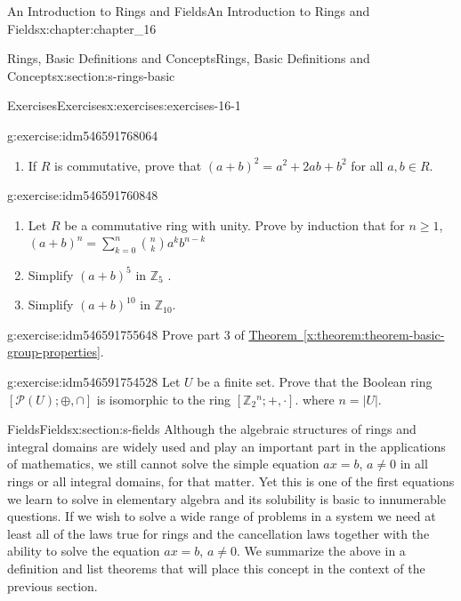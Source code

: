 \documentclass[oneside,10pt,]{book}
\newcommand{\xreffont}{\relax}
\numberwithin{equation}{section}
\begin{document}
\begin{chapterptx}{An Introduction to Rings and Fields}{}{An Introduction to Rings and Fields}{}{}{x:chapter:chapter_16}
\begin{sectionptx}{Rings, Basic Definitions and Concepts}{}{Rings, Basic Definitions and Concepts}{}{}{x:section:s-rings-basic}
\begin{exercises-subsection}{Exercises}{}{Exercises}{}{}{x:exercises:exercises-16-1}
\begin{divisionexercise}{13}{}{}{g:exercise:idm546591768064}
\begin{enumerate}[label=(\alph*)]
\item{}If \(R\) is commutative, prove that \((a + b)^2 = a^2 + 2a b + b^2\)  for all \(a, b \in  R\).%
\end{enumerate}
%
\end{divisionexercise}%
\begin{divisionexercise}{14}{}{}{g:exercise:idm546591760848}%
%
\begin{enumerate}[label=(\alph*)]
\item{}Let \(R\) be a commutative ring with unity. Prove by induction that for \(n \geq  1\), \((a+b)^n= \sum _{k=0}^n  \binom{n}{k}a^k b^{n-k}\)%
\item{}Simplify \((a + b)^5\) in \(\mathbb{Z}_5\) .%
\item{}Simplify \((a + b)^{10}\) in \(\mathbb{Z}_{10}\).%
\end{enumerate}
%
\end{divisionexercise}%
\begin{divisionexercise}{15}{}{}{g:exercise:idm546591755648}%
Prove part 3 of \hyperref[x:theorem:theorem-basic-group-properties]{Theorem~{\xreffont\ref{x:theorem:theorem-basic-group-properties}}}.%
\end{divisionexercise}%
\begin{divisionexercise}{16}{}{}{g:exercise:idm546591754528}%
Let \(U\) be a finite set. Prove that the Boolean ring \([\mathcal{P}(U);\oplus ,\cap ]\) is isomorphic to the ring \(\left[\mathbb{Z}_2{}^n; +, \cdot \right]\). where \(n =\left| U\right|\).%
\end{divisionexercise}%
\end{exercises-subsection}
\end{sectionptx}
%
%
\typeout{************************************************}
\typeout{************************************************}
%
\begin{sectionptx}{Fields}{}{Fields}{}{}{x:section:s-fields}
Although the algebraic structures of rings and integral domains are widely used and play an important part in the applications of mathematics, we still cannot solve the simple equation \(a x = b\), \(a \neq  0\) in all rings or  all integral domains, for that matter. Yet this is one of the first equations we learn to solve in elementary algebra and its solubility is basic to innumerable questions. If we wish to solve a wide range of problems in a system we need at least all of the laws true for rings and the cancellation laws together with the ability to solve the equation \(a x = b\), \(a \neq  0\). We summarize the above in a definition and list theorems  that will place this concept in the context of the previous section.%

\end{sectionptx}
\end{chapterptx}
\end{document}
